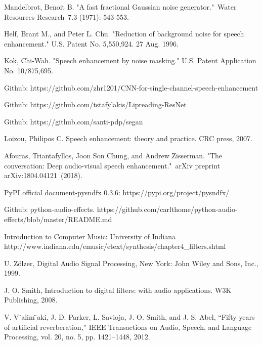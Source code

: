 \documentclass[runningheads,a4paper]{llncs}
\begin{document}
\begin{thebibliography}{4}
 Mandelbrot, Benoit B. "A fast fractional Gaussian noise generator." Water Resources Research 7.3 (1971): 543-553.

 Helf, Brant M., and Peter L. Chu. "Reduction of background noise for speech enhancement." U.S. Patent No. 5,550,924. 27 Aug. 1996.

 Kok, Chi-Wah. "Speech enhancement by noise masking." U.S. Patent Application No. 10/875,695.

 Github: https://github.com/zhr1201/CNN-for-single-channel-speech-enhancement

  Github: https://github.com/tstafylakis/Lipreading-ResNet

 Github: https://github.com/santi-pdp/segan

 Loizou, Philipos C. Speech enhancement: theory and practice. CRC press, 2007.

 Afouras, Triantafyllos, Joon Son Chung, and Andrew Zisserman. "The conversation: Deep audio-visual speech enhancement." arXiv preprint arXiv:1804.04121 (2018).

 PyPI official document-pysndfx 0.3.6: https://pypi.org/project/pysndfx/ 

 Github: python-audio-effects. https://github.com/carlthome/python-audio-effects/blob/master/README.md

 Introduction to Computer Music: University of Indiana
http://www.indiana.edu/emusic/etext/synthesis/chapter4_filters.shtml

 U. Zölzer, Digital Audio Signal Processing, 
New York: John Wiley and Sons, Inc., 1999.

 J. O. Smith, Introduction to digital filters: with audio applications. W3K Publishing, 2008.

 V. V ̈alim ̈aki, J. D. Parker, L. Savioja, J. O. Smith, and J. S. Abel, “Fifty years of artificial reverberation,” IEEE Transactions on Audio, Speech, and Language Processing, vol. 20, no. 5, pp. 1421–1448, 2012.


\end{thebibliography}



\end{document}
